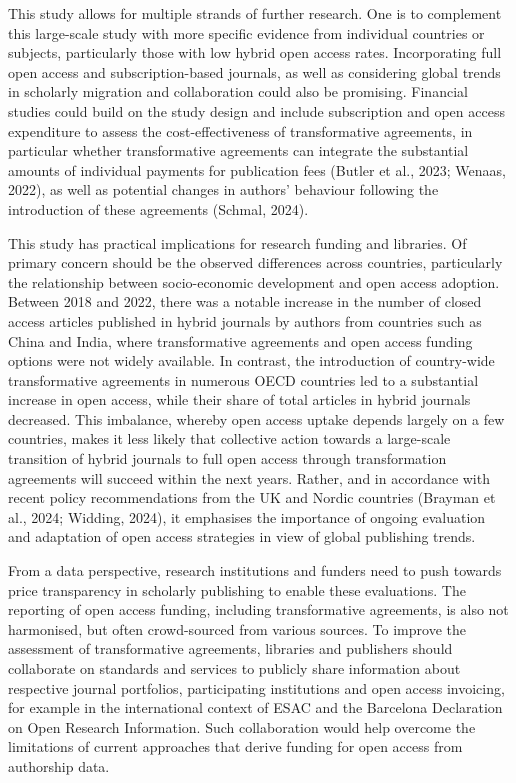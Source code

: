 \documentclass[a4paper,man,floatsintext,longtable,noextraspace,12pt]{apa6}
\begin{document}
This study allows for multiple strands of further research. One is to
complement this large-scale study with more specific evidence from
individual countries or subjects, particularly those with low hybrid
open access rates. Incorporating full open access and subscription-based
journals, as well as considering global trends in scholarly migration
and collaboration could also be promising. Financial studies could build
on the study design and include subscription and open access expenditure
to assess the cost-effectiveness of transformative agreements, in
particular whether transformative agreements can integrate the
substantial amounts of individual payments for publication fees (Butler
et al., 2023; Wenaas, 2022), as well as potential changes in authors'
behaviour following the introduction of these agreements (Schmal, 2024).

This study has practical implications for research funding and
libraries. Of primary concern should be the observed differences across
countries, particularly the relationship between socio-economic
development and open access adoption. Between 2018 and 2022, there was a
notable increase in the number of closed access articles published in
hybrid journals by authors from countries such as China and India, where
transformative agreements and open access funding options were not
widely available. In contrast, the introduction of country-wide
transformative agreements in numerous OECD countries led to a
substantial increase in open access, while their share of total articles
in hybrid journals decreased. This imbalance, whereby open access uptake
depends largely on a few countries, makes it less likely that collective
action towards a large-scale transition of hybrid journals to full open
access through transformation agreements will succeed within the next
years. Rather, and in accordance with recent policy recommendations from
the UK and Nordic countries (Brayman et al., 2024; Widding, 2024), it
emphasises the importance of ongoing evaluation and adaptation of open
access strategies in view of global publishing trends.

From a data perspective, research institutions and funders need to push
towards price transparency in scholarly publishing to enable these
evaluations. The reporting of open access funding, including
transformative agreements, is also not harmonised, but often
crowd-sourced from various sources. To improve the assessment of
transformative agreements, libraries and publishers should collaborate
on standards and services to publicly share information about respective
journal portfolios, participating institutions and open access
invoicing, for example in the international context of ESAC and the
Barcelona Declaration on Open Research Information. Such collaboration
would help overcome the limitations of current approaches that derive
funding for open access from authorship data.
\end{document}
